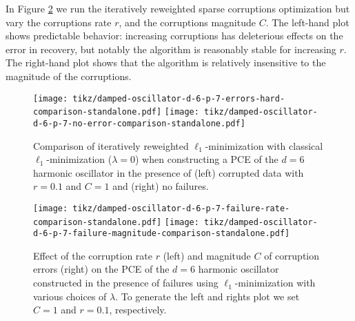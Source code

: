 In Figure \ref{fig:oscillator-approximation-errors-rate-mag-comparison} we run the iteratively reweighted sparse corruptions optimization  but vary the corruptions rate $r$, and the corruptions magnitude $C$. The left-hand plot shows predictable behavior: increasing corruptions has deleterious effects on the error in recovery, but notably the algorithm is reasonably stable for increasing $r$. The right-hand plot shows that the algorithm is relatively insensitive to the magnitude of the corruptions.


\begin{figure}[ht]
\centering
\texttt{[image: tikz/damped-oscillator-d-6-p-7-errors-hard-comparison-standalone.pdf]}
\texttt{[image: tikz/damped-oscillator-d-6-p-7-no-error-comparison-standalone.pdf]}
\caption{Comparison of iteratively reweighted $\ell_1$-minimization with classical $\ell_1$-minimization ($\lambda=0$) when constructing a PCE of the $d=6$ harmonic oscillator in the presence of (left) corrupted data with $r=0.1$ and $C=1$ and (right) no failures.}
\label{fig:oscillator-approximation-errors-hard-comparison}
\end{figure}

\begin{figure}[ht]
\centering
\texttt{[image: tikz/damped-oscillator-d-6-p-7-failure-rate-comparison-standalone.pdf]}
\texttt{[image: tikz/damped-oscillator-d-6-p-7-failure-magnitude-comparison-standalone.pdf]}
\caption{Effect of the corruption rate $r$ (left) and magnitude $C$ of corruption errors (right) on the PCE  of the $d=6$ harmonic oscillator constructed in the presence of failures using $\ell_1$-minimization with various choices of $\lambda$. To generate the left and rights plot we set $C=1$ and $r=0.1$, respectively.}
\label{fig:oscillator-approximation-errors-rate-mag-comparison}
\end{figure}

